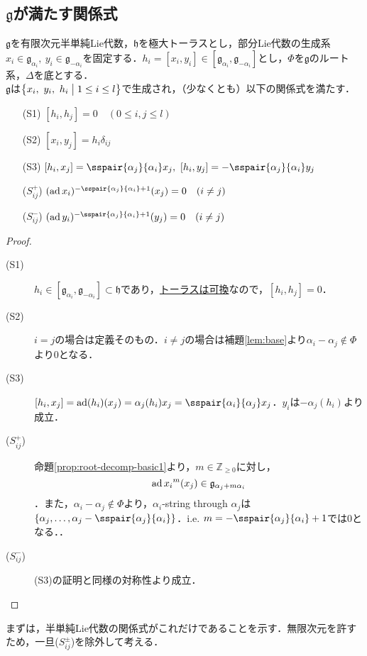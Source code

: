 \documentclass[rep_main]{subfiles}
\begin{document}
\subsection{$\mathfrak{g}$が満たす関係式}
\begin{myprop}[label=prop:semisimple-Lie-alg-relation]{}
	$\mathfrak{g}$を有限次元半単純Lie代数，$\mathfrak{h}$を極大トーラスとし，部分Lie代数の生成系$x_i \in \mathfrak{g}_{\alpha_i},\ y_i \in \mathfrak{g}_{-\alpha_i}$を固定する．$h_i = [x_i, y_i] \in [\mathfrak{g}_{\alpha_i}, \mathfrak{g}_{-\alpha_i}]$とし，$\Phi$を$\mathfrak{g}$のルート系，$\Delta$を底とする．\\
	$\mathfrak{g}$は$\bigl\{ x_i,\ y_i,\ h_i \bigm| 1 \leq i \leq l \bigr\}$で生成され，（少なくとも）以下の関係式を満たす．
	\begin{enumerate}
		\item[(S1)] $[h_i, h_j] = 0\quad  (0 \leq i, j \leq l)$
		\item[(S2)] $[x_i, y_j] = h_i\delta_{ij}$
		\item[(S3)] $[h_i, x_j] = \sspair{\alpha_j}{\alpha_i}x_j,\ [h_i, y_j] = -\sspair{\alpha_j}{\alpha_i}y_j$
		\item[($S_{ij}^+$)] $(\ad x_i)^{-\sspair{\alpha_j}{\alpha_i} + 1}(x_j) = 0\quad  (i \neq j)$
		\item[($S_{ij}^-$)] $(\ad y_i)^{-\sspair{\alpha_j}{\alpha_i} + 1}(y_j) = 0\quad  (i \neq j)$
	\end{enumerate}
\end{myprop}
\begin{proof}
	\begin{description}
		\item[(S1)] $h_i  \in [\mathfrak{g}_{\alpha_i}, \mathfrak{g}_{-\alpha_i}] \subset \mathfrak{h}$であり，\hyperref[lem:torus]{トーラスは可換}なので，$[h_i, h_j] = 0$．
		\item[(S2)] $i = j$の場合は定義そのもの．$i \neq j$の場合は補題\ref{lem:base}より$\alpha_i - \alpha_j \notin \Phi$より$0$となる．
		\item[(S3)] $[h_i, x_j] = \ad(h_i)(x_j) = \alpha_j(h_i)x_j = \sspair{\alpha_i}{\alpha_j}x_j$．$y_i$は$-\alpha_j(h_i)$より成立．
		\item[($S_{ij}^+$)] 命題\ref{prop:root-decomp-basic1}より，$m \in \mathbb{Z}_{\geq 0}$に対し，
		\begin{equation}
			\operatorname{ad}{x_i}^{m}(x_j) \in \mathfrak{g}_{\alpha_j + m\alpha_i}
		\end{equation}
		．また，\hyperref[lem:base]{$\alpha_i - \alpha_j \notin \Phi$}より，$\alpha_i$-string through $\alpha_j$は$\{\alpha_j, \ldots, \alpha_j - \sspair{\alpha_j}{\alpha_i}\}$．i.e. $m = -\sspair{\alpha_j}{\alpha_i} + 1$では$0$となる．．
		\item[($S_{ij}^-$)] (S3)の証明と同様の対称性より成立．
	\end{description}
\end{proof}
まずは，半単純Lie代数の関係式がこれだけであることを示す．無限次元を許すため，一旦($S_{ij}^\pm$)を除外して考える．
\end{document}
